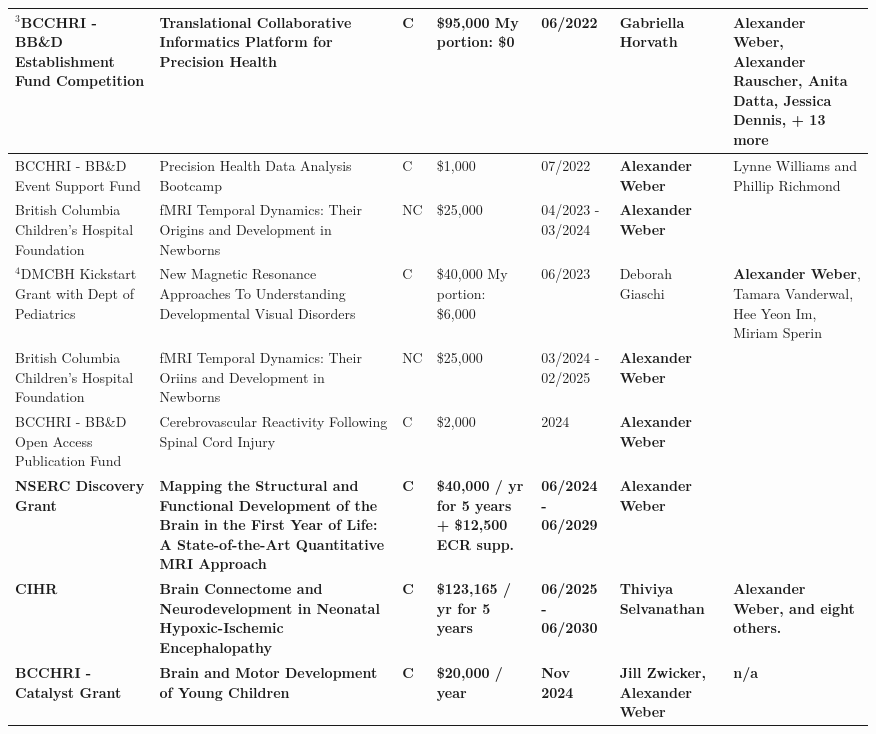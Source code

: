 \documentclass[11pt,notitlepage,english]{report}
\begin{document}
\begin{longtable}{|L{2.7cm}|L{4cm}|L{1cm}|L{2cm}|L{1.7cm}|L{2cm}|L{3cm}|}
  \hline
  $^{3}$BCCHRI - BB\&D Establishment Fund Competition & Translational Collaborative Informatics Platform for Precision Health & C & \$95,000 \newline My portion: \$0 & 06/2022 & Gabriella Horvath & \textbf{Alexander Weber}, Alexander Rauscher, Anita Datta, Jessica Dennis, + 13 more \\
  \hline
  BCCHRI - BB\&D Event Support Fund & Precision Health Data Analysis Bootcamp & C & \$1,000 & 07/2022 & \textbf{Alexander Weber} & Lynne Williams and Phillip Richmond \\
  \hline
  British Columbia Children's Hospital Foundation & fMRI Temporal Dynamics: Their Origins and Development in Newborns & NC & \$25,000 & 04/2023 - 03/2024 & \textbf{Alexander Weber} & \\
  \hline
$^{4}$DMCBH Kickstart Grant with Dept of Pediatrics & New Magnetic Resonance Approaches To Understanding Developmental Visual Disorders & C & \$40,000 \newline \newline My portion: \$6,000 & 06/2023 & Deborah Giaschi & \textbf{Alexander Weber}, Tamara Vanderwal, Hee Yeon Im, Miriam Sperin \\
  \hline
  British Columbia Children's Hospital Foundation & fMRI Temporal Dynamics: Their Oriins and Development in Newborns & NC & \$25,000 & 03/2024 - 02/2025 & \textbf{Alexander Weber} & \\
  \hline
  BCCHRI - BB\&D Open Access Publication Fund & Cerebrovascular Reactivity Following Spinal Cord Injury & C & \$2,000 & 2024 & \textbf{Alexander Weber} & \\
  \hline
  \textbf{NSERC Discovery Grant} & \textbf{Mapping the Structural and Functional Development of the Brain in the First Year of Life: A State-of-the-Art Quantitative MRI Approach} & \textbf{C} & \textbf{\$40,000 / yr for 5 years \newline + \$12,500 ECR supp.} & \textbf{06/2024 - 06/2029} & \textbf{Alexander Weber} & \\
  \hline
  \textbf{CIHR} & \textbf{Brain Connectome and Neurodevelopment in Neonatal Hypoxic-Ischemic Encephalopathy} & \textbf{C} & \textbf{\$123,165 / yr for 5 years} & \textbf{06/2025 - 06/2030} & \textbf{Thiviya Selvanathan } & \textbf{Alexander Weber, and eight others.}\\
  \hline
  \textbf{BCCHRI - Catalyst Grant} & \textbf{Brain and Motor Development of Young Children} & \textbf{C} & \textbf{\$20,000 / year} & \textbf{Nov 2024} & \textbf{Jill Zwicker, Alexander Weber} & \textbf{n/a} \\

\end{longtable}
\end{document}
